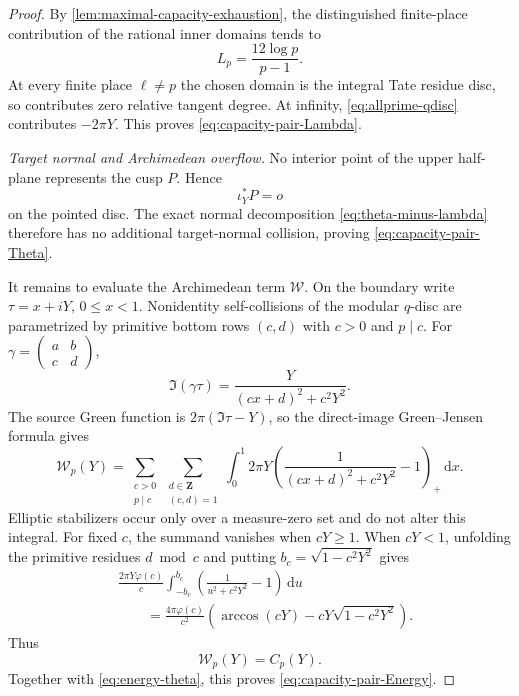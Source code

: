 \documentclass[11pt]{article}
\theoremstyle{definition}
\theoremstyle{remark}
\newcommand{\Z}{\mathbf Z}
\newcommand{\dd}{\,\mathrm d}
\begin{document}
\begin{proof}
By \cref{lem:maximal-capacity-exhaustion}, the distinguished finite-place
contribution of the rational inner domains tends to
\[
 L_p=\frac{12\log p}{p-1}.
\]
At every finite place $\ell\ne p$ the chosen domain is the integral Tate
residue disc, so \cite[Example~5.11]{BostChambertLoir2009} contributes zero
relative tangent degree.  At infinity, \eqref{eq:allprime-qdisc} contributes
$-2\pi Y$.  This proves \eqref{eq:capacity-pair-Lambda}.

\smallskip
\noindent\emph{Target normal and Archimedean overflow.}
No interior point of the upper half-plane represents the cusp $P$.  Hence
\[
 \iota_Y^*P=o
\]
on the pointed disc.  The exact normal decomposition
\eqref{eq:theta-minus-lambda} therefore has no additional target-normal
collision, proving \eqref{eq:capacity-pair-Theta}.

It remains to evaluate the Archimedean term $\mathscr W$.  On the boundary
write $\tau=x+iY$, $0\le x<1$.  Nonidentity self-collisions of the modular
$q$-disc are parametrized by primitive bottom rows $(c,d)$ with
$c>0$ and $p\mid c$.  For
$\gamma=\left(\begin{smallmatrix}a&b\\c&d\end{smallmatrix}\right)$,
\[
 \Im(\gamma\tau)=\frac{Y}{(cx+d)^2+c^2Y^2}.
\]
The source Green function is $2\pi(\Im\tau-Y)$, so the direct-image
Green--Jensen formula gives
\begin{equation}\label{eq:allprime-collision-unfold}
 \mathscr W_p(Y)
 =\sum_{\substack{c>0\\p\mid c}}
   \sum_{\substack{d\in\Z\\(c,d)=1}}
   \int_0^1 2\pi Y
   \left(\frac1{(cx+d)^2+c^2Y^2}-1\right)_+\dd x.
\end{equation}
Elliptic stabilizers occur only over a measure-zero set and do not alter this
integral.  For fixed $c$, the summand vanishes when $cY\ge1$.  When $cY<1$,
unfolding the primitive residues $d\bmod c$ and putting
$b_c=\sqrt{1-c^2Y^2}$ gives
\begin{align*}
 &\frac{2\pi Y\varphi(c)}c
 \int_{-b_c}^{b_c}
 \left(\frac1{u^2+c^2Y^2}-1\right)\dd u\\
 &\qquad=
 \frac{4\pi\varphi(c)}{c^2}
 \left(\arccos(cY)-cY\sqrt{1-c^2Y^2}\right).
\end{align*}
Thus
\begin{equation}\label{eq:allprime-W-C}
 \mathscr W_p(Y)=C_p(Y).
\end{equation}
Together with \eqref{eq:energy-theta}, this proves
\eqref{eq:capacity-pair-Energy}.


\end{proof}
\end{document}
